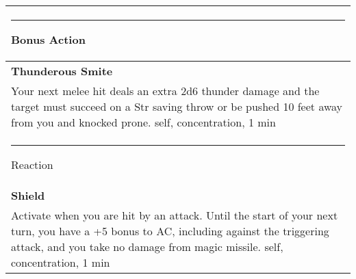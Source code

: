 \documentclass[twocolumn]{article}
\begin{document}
\\
\noindent\begin{tabular}{|m{3.1in}|}
\hline
\rule{1.1in}{0pt}Bonus Action\\
\hline
\textbf{Thunderous Smite}\\
Your next melee hit deals an extra 2d6 thunder damage and the target must succeed on a Str saving throw or be pushed 10 feet away from you and knocked prone. {\sc self, concentration, 1 min}\\
\hline
\rule{1.2in}{0pt}Reaction\\
\hline
\textbf{Shield}\\
Activate when you are hit by an attack. Until the start of your next turn, you have a +5 bonus to AC, including against the triggering attack, and you take no damage from magic missile. {\sc self, concentration, 1 min}\\
\hline
\end{tabular}
\vspace{8pt}
\end{document}
